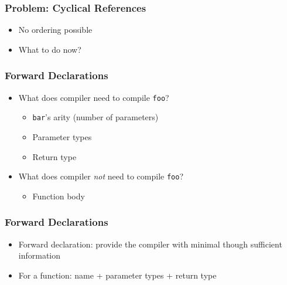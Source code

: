 \documentclass{../ucll-slides}
\begin{document}
\begin{frame}
  \frametitle{Problem: Cyclical References}
  \begin{overprint}
  \end{overprint}
  \begin{itemize}
    \item No ordering possible
    \item What to do now?
  \end{itemize}
\end{frame}

\begin{frame}
  \frametitle{Forward Declarations}
  \begin{itemize}
    \item What does compiler need to compile {\tt foo}?
          \begin{itemize}
            \item {\tt bar}'s arity (number of parameters)
            \item Parameter types
            \item Return type
          \end{itemize}
    \item What does compiler \emph{not} need to compile {\tt foo}?
          \begin{itemize}
            \item Function body
          \end{itemize}
  \end{itemize}
\end{frame}

\begin{frame}
  \frametitle{Forward Declarations}
  \begin{overprint}
  \end{overprint}
  \begin{itemize}
    \item Forward declaration: provide the compiler with minimal though sufficient information
    \item For a function: name + parameter types + return type
  \end{itemize}
\end{frame}
\end{document}
